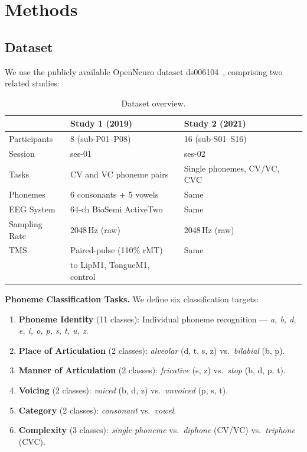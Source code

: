 \documentclass[11pt,a4paper]{article}
\begin{document}
\section{Methods}

\subsection{Dataset}

We use the publicly available OpenNeuro dataset ds006104~\cite{moreira2024},
comprising two related studies:

\begin{table}[H]
\centering
\caption{Dataset overview.}
\label{tab:dataset}
\begin{tabular}{lll}
\toprule
 & \textbf{Study 1 (2019)} & \textbf{Study 2 (2021)} \\
\midrule
Participants    & 8 (sub-P01--P08)           & 16 (sub-S01--S16)              \\
Session         & ses-01                      & ses-02                         \\
Tasks           & CV and VC phoneme pairs     & Single phonemes, CV/VC, CVC    \\
Phonemes        & 6 consonants + 5 vowels     & Same                           \\
EEG System      & 64-ch BioSemi ActiveTwo     & Same                           \\
Sampling Rate   & 2048\,Hz (raw)              & 2048\,Hz (raw)                 \\
TMS             & Paired-pulse (110\% rMT)    & Same                           \\
                & to LipM1, TongueM1, control &                                \\
\bottomrule
\end{tabular}
\end{table}

\textbf{Phoneme Classification Tasks.} We define six classification targets:

\begin{enumerate}
  \item \textbf{Phoneme Identity} (11 classes): Individual phoneme recognition
    --- \textit{a, b, d, e, i, o, p, s, t, u, z}.
  \item \textbf{Place of Articulation} (2 classes): \textit{alveolar} (d, t, s,
    z) vs.\ \textit{bilabial} (b, p).
  \item \textbf{Manner of Articulation} (2 classes): \textit{fricative} (s, z)
    vs.\ \textit{stop} (b, d, p, t).
  \item \textbf{Voicing} (2 classes): \textit{voiced} (b, d, z)
    vs.\ \textit{unvoiced} (p, s, t).
  \item \textbf{Category} (2 classes): \textit{consonant} vs.\ \textit{vowel}.
  \item \textbf{Complexity} (3 classes): \textit{single phoneme}
    vs.\ \textit{diphone} (CV/VC) vs.\ \textit{triphone} (CVC).
\end{enumerate}
\end{document}
